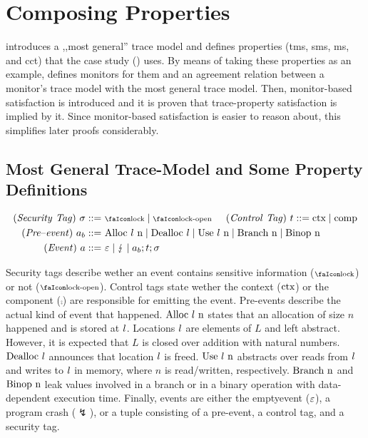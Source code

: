 \documentclass[acmsmall,review,screen,dvipsnames]{acmart}
\begin{document}
\section{Composing Properties}\label{sec:compprop}
 introduces a ,,most general'' trace model and defines properties (\gls{tms}, \gls{sms}, \gls{ms}, and \gls{cct}) that the case study () uses.
By means of taking these properties as an example,  defines monitors for them and an agreement relation between a monitor's trace model with the most general trace model.
Then, monitor-based satisfaction is introduced and it is proven that trace-property satisfaction is implied by it.
Since monitor-based satisfaction is easier to reason about, this simplifies later proofs considerably.

\subsection{Most General Trace-Model and Some Property Definitions}\label{subsec:propdefs}

\begin{gather*}
  \begin{aligned}
  \mi{(Security\ Tag)}~\sigma\bnfdef&\ \lock \mid \unlock\hspace{0.5cm}
  \mi{(Control\ Tag)}~\sandboxtag\bnfdef \ctx\mid\comp\\
  \mi{(Pre\text{--}event)}~\event[_{b}]\bnfdef&\ \ev{Alloc\ \loc\ n} \mid \ev{Dealloc\ \loc} \mid \ev{Use\ \loc\ n} \mid \ev{Branch\ n} \mid \ev{Binop\ n} \\
  \mi{(Event)}~\event\bnfdef&\ \emptyevent \mid \lightning \mid \event[_{b}];\sandboxtag;\sigma \\
  \end{aligned}
\end{gather*}

Security tags describe wether an event contains sensitive information ($\lock$) or not ($\unlock$).
Control tags state wether the context ($\text{ctx}$) or the component ($\comp$) are responsible for emitting the event.
Pre-events describe the actual kind of event that happened.
$\ev{Alloc\ \loc\ n}$ states that an allocation of size $n$ happened and is stored at $l$.
Locations $l$ are elements of $L$ and left abstract.
However, it is expected that $L$ is closed over addition with natural numbers.
$\text{Dealloc\ \ensuremath l}$ announces that location $l$ is freed.
$\text{Use\ \ensuremath l\ n}$ abstracts over reads from $l$ and writes to $l$ in memory, where $n$ is read/written, respectively.
$\ev{Branch\ n}$ and $\text{Binop\ n}$ leak values involved in a branch or in a binary operation with data-dependent execution time.
Finally, events are either the emptyevent ($\varepsilon$), a program crash ($\lightning$), or a tuple consisting of a pre-event, a control tag, and a security tag.
\end{document}
